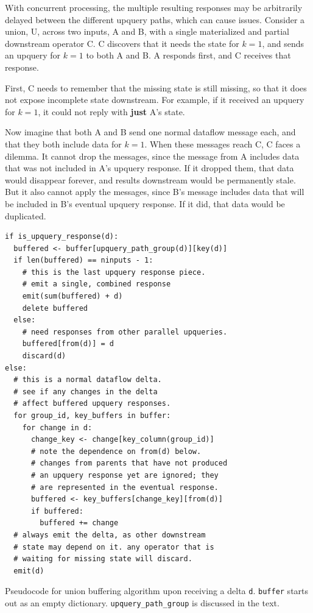 With concurrent processing, the multiple resulting responses may be arbitrarily
delayed between the different upquery paths, which can cause issues. Consider
a union, U, across two inputs, A and B, with a single materialized and partial
downstream operator C. C discovers that it needs the state for $k = 1$, and
sends an upquery for $k = 1$ to both A and B. A responds first, and C receives
that response.

First, C needs to remember that the missing state is still missing, so that it
does not expose incomplete state downstream. For example, if it received an
upquery for $k = 1$, it could not reply with \textbf{just} A's state.

Now imagine that both A and B send one normal dataflow message each, and that
they both include data for $k = 1$. When these messages reach C, C faces a
dilemma. It cannot drop the messages, since the message from A includes data
that was not included in A's upquery response. If it dropped them, that data
would disappear forever, and results downstream would be permanently stale. But
it also cannot apply the messages, since B's message includes data that will be
included in B's eventual upquery response. If it did, that data would be
duplicated.

\begin{listing}
  \begin{verbatim}
if is_upquery_response(d):
  buffered <- buffer[upquery_path_group(d)][key(d)]
  if len(buffered) == ninputs - 1:
    # this is the last upquery response piece.
    # emit a single, combined response
    emit(sum(buffered) + d)
    delete buffered
  else:
    # need responses from other parallel upqueries.
    buffered[from(d)] = d
    discard(d)
else:
  # this is a normal dataflow delta.
  # see if any changes in the delta
  # affect buffered upquery responses.
  for group_id, key_buffers in buffer:
    for change in d:
      change_key <- change[key_column(group_id)]
      # note the dependence on from(d) below.
      # changes from parents that have not produced
      # an upquery response yet are ignored; they
      # are represented in the eventual response.
      buffered <- key_buffers[change_key][from(d)]
      if buffered:
        buffered += change
  # always emit the delta, as other downstream
  # state may depend on it. any operator that is
  # waiting for missing state will discard.
  emit(d)
  \end{verbatim}
  \caption{Pseudocode for union buffering algorithm upon receiving a delta
  \texttt{d}. \texttt{buffer} starts out as an empty dictionary.
  \texttt{upquery\_path\_group} is discussed in the text.}
  \label{l:union-buffer}
\end{listing}

